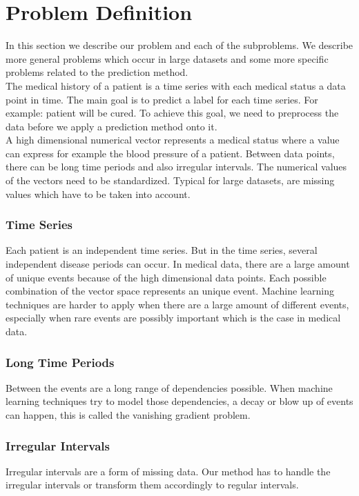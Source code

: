 \documentclass[journal]{IEEETemplate/IEEEtran}
\begin{document}
\section{Problem Definition}
In this section we describe our problem and each of the subproblems. We describe more general problems which occur in large datasets and some more specific problems related to the prediction method. \\

The medical history of a patient is a time series with each medical status a data point in time. The main goal is to predict a label for each time series. For example: patient will be cured. To achieve this goal, we need to preprocess the data before we apply a prediction method onto it. \\
A high dimensional numerical vector represents a medical status where a value can express for example the blood pressure of a patient. Between data points, there can be long time periods and also irregular intervals. The numerical values of the vectors need to be standardized. Typical for large datasets, are missing values which have to be taken into account. \\

\subsubsection{Time Series}
Each patient is an independent time series. But in the time series, several independent disease periods can occur. In medical data, there are a large amount of unique events because of the high dimensional data points. Each possible combination of the vector space represents an unique event. Machine learning techniques are harder to apply when there are a large amount of different events\cite{7}, especially when rare events are possibly important which is the case in medical data\cite{8}. \\
\subsubsection{Long Time Periods}
\label{sec:LongTimePeriods}
Between the events are a long range of dependencies possible. When machine learning techniques try to model those dependencies, a decay or blow up of events can happen, this is called the vanishing gradient problem\cite{9}. \\
\subsubsection{Irregular Intervals}
\label{sec:IrregularIntervals}
Irregular intervals are a form of missing data. Our method has to handle the irregular intervals or transform them accordingly to regular intervals\cite{10}. \\
\end{document}
